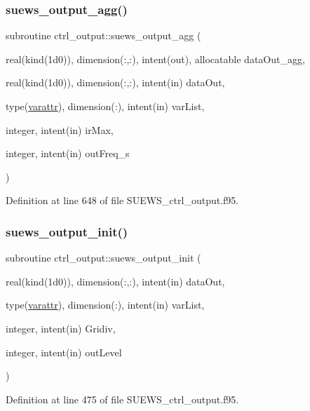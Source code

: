 \subsubsection{\texorpdfstring{suews\+\_\+output\+\_\+agg()}{suews\_output\_agg()}}
{\footnotesize\ttfamily subroutine ctrl\+\_\+output\+::suews\+\_\+output\+\_\+agg (\begin{DoxyParamCaption}\item[{real(kind(1d0)), dimension(\+:,\+:), intent(out), allocatable}]{data\+Out\+\_\+agg,  }\item[{real(kind(1d0)), dimension(\+:,\+:), intent(in)}]{data\+Out,  }\item[{type(\hyperlink{structctrl__output_1_1varattr}{varattr}), dimension(\+:), intent(in)}]{var\+List,  }\item[{integer, intent(in)}]{ir\+Max,  }\item[{integer, intent(in)}]{out\+Freq\+\_\+s }\end{DoxyParamCaption})}



Definition at line 648 of file S\+U\+E\+W\+S\+\_\+ctrl\+\_\+output.\+f95.

\mbox{\label{namespacectrl__output_aa089b1e6d88c1556fb0d0f645face272}} 
\subsubsection{\texorpdfstring{suews\+\_\+output\+\_\+init()}{suews\_output\_init()}}
{\footnotesize\ttfamily subroutine ctrl\+\_\+output\+::suews\+\_\+output\+\_\+init (\begin{DoxyParamCaption}\item[{real(kind(1d0)), dimension(\+:,\+:), intent(in)}]{data\+Out,  }\item[{type(\hyperlink{structctrl__output_1_1varattr}{varattr}), dimension(\+:), intent(in)}]{var\+List,  }\item[{integer, intent(in)}]{Gridiv,  }\item[{integer, intent(in)}]{out\+Level }\end{DoxyParamCaption})}



Definition at line 475 of file S\+U\+E\+W\+S\+\_\+ctrl\+\_\+output.\+f95.


